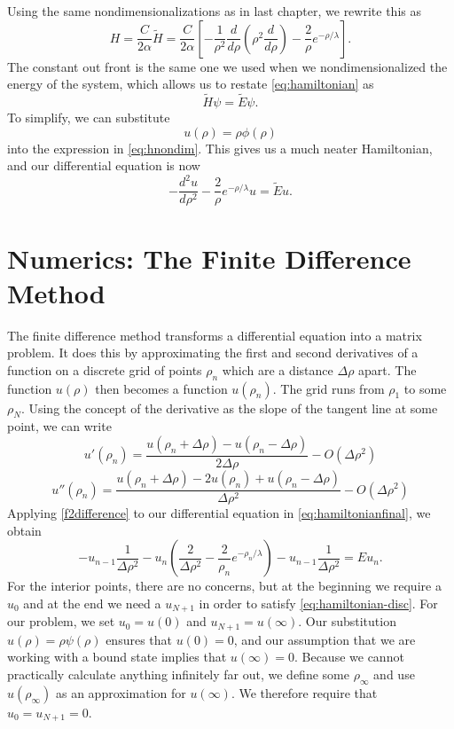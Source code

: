 \documentclass[12pt,twoside]{reedthesis}
\newcommand{\eqn}[1]{\begin{equation}#1\end{equation}}
\begin{document}
Using the same nondimensionalizations as in last chapter, we rewrite this as 
\eqn{
H=\frac{C}{2\alpha}\tilde{H} = \frac{C}{2\alpha} \left[- \frac{1}{\rho^2}\frac{d}{d\rho}\left(\rho^2\frac{d}{d\rho}\right) - \frac{2}{\rho}e^{-\rho/\lambda}\right]\mbox{.}
\label{eq:hnondim}
}
The constant out front is the same one we used when we nondimensionalized the energy of the system, which allows us to restate \eqref{eq:hamiltonian} as
\eqn{
\tilde{H}\psi = \tilde{E}\psi\mbox{.}
}
To simplify, we can substitute 
\eqn{
u(\rho)=\rho \phi(\rho)}
into the expression in \eqref{eq:hnondim}\cite{griffiths_introduction_2005}. This gives us a much neater Hamiltonian, and our differential equation is now
\eqn{
-\frac{d^2 u }{d \rho^2} - \frac{2}{\rho}e^{-\rho/\lambda}u = \tilde{E} u\mbox{.}
\label{eq:hamiltonianfinal}
}

\section{Numerics: The Finite Difference Method}
The finite difference method transforms a differential equation into a matrix problem\cite{numerical_recipes}. It does this by approximating the first and second derivatives of a function on a discrete grid of points $\rho_n$ which are a distance $\Delta \rho$ apart. The function $u(\rho)$ then becomes a function $u(\rho_n)$. The grid runs from $\rho_1$ to some $\rho_N$. Using the concept of the derivative as the slope of the tangent line at some point, we can write
\eqn{
u'(\rho_n) = \frac{u(\rho_n + \Delta \rho) - u(\rho_n - \Delta \rho)}{2 \Delta \rho} - O(\Delta{\rho}^2)
\label{fdifference}
}
\eqn{
u''(\rho_n) = \frac{u(\rho_n + \Delta \rho) - 2 u(\rho_n) + u(\rho_n - \Delta \rho)}{\Delta \rho^2}-O(\Delta{\rho}^2) 
\label{f2difference}
}
Applying \eqref{f2difference} to our differential equation in \eqref{eq:hamiltonianfinal}, we obtain
\eqn{
-u_{n-1}\frac{1}{\Delta \rho^2} - u_n\left(\frac{2} {\Delta \rho^2} -  \frac{2}{\rho_n}e^{-\rho_n/\lambda} \right) - u_{n-1}\frac{1}{\Delta \rho^2}  = E u_n\mbox{.}
\label{eq:hamiltonian-disc}
}
For the interior points, there are no concerns, but at the beginning we require a $u_0$ and at the end we need a $u_{N+1}$ in order to satisfy \eqref{eq:hamiltonian-disc}. For our problem, we set $u_0 = u(0)$  and $u_{N+1} = u(\infty)$. Our substitution $u(\rho) = \rho \psi(\rho)$ ensures that $u(0) = 0$, and our assumption that we are working with a bound state implies that $u(\infty) = 0$. Because we cannot practically calculate anything infinitely far out, we define some $\rho_{\infty}$ and use $u(\rho_{\infty})$ as an approximation for $u(\infty)$. We therefore require that $u_0 = u_{N+1} = 0$.
\end{document}
